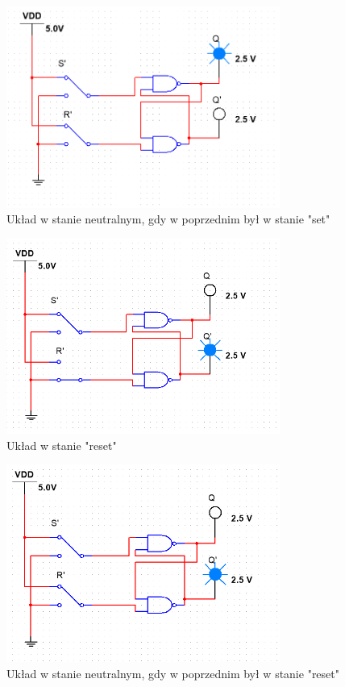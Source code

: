 \documentclass{article}
\begin{document}
\begin{figure}[H]
    \centering
    \includegraphics[width=0.8\textwidth]{rs_Q_save.png}
    \caption{Układ w stanie neutralnym, gdy w poprzednim był w stanie "set"}
\end{figure}

\begin{figure}[H]
    \centering
    \includegraphics[width=0.8\textwidth]{rs_nQ.png}
    \caption{Układ w stanie "reset"}
\end{figure}

\begin{figure}[H]
    \centering
    \includegraphics[width=0.8\textwidth]{rs_nQ_save.png}
    \caption{Układ w stanie neutralnym, gdy w poprzednim był w stanie "reset"}
\end{figure}
\end{document}
